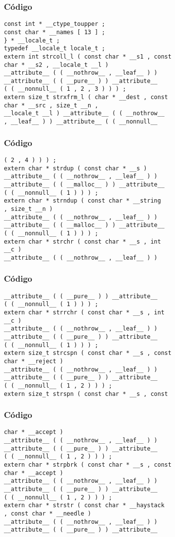 \documentclass{beamer}
\begin{document}
\begin{frame}[fragile]
\frametitle{C\'odigo}
\begin{verbatim}
const int * __ctype_toupper ; 
const char * __names [ 13 ] ; 
} * __locale_t ; 
typedef __locale_t locale_t ; 
extern int strcoll_l ( const char * __s1 , const 
char * __s2 , __locale_t __l ) 
__attribute__ ( ( __nothrow__ , __leaf__ ) ) 
__attribute__ ( ( __pure__ ) ) __attribute__ 
( ( __nonnull__ ( 1 , 2 , 3 ) ) ) ; 
extern size_t strxfrm_l ( char * __dest , const 
char * __src , size_t __n , 
__locale_t __l ) __attribute__ ( ( __nothrow__ 
, __leaf__ ) ) __attribute__ ( ( __nonnull__ 
\end{verbatim}
\end{frame}
\begin{frame}[fragile]
\frametitle{C\'odigo}
\begin{verbatim}
( 2 , 4 ) ) ) ; 
extern char * strdup ( const char * __s ) 
__attribute__ ( ( __nothrow__ , __leaf__ ) ) 
__attribute__ ( ( __malloc__ ) ) __attribute__ 
( ( __nonnull__ ( 1 ) ) ) ; 
extern char * strndup ( const char * __string 
, size_t __n ) 
__attribute__ ( ( __nothrow__ , __leaf__ ) ) 
__attribute__ ( ( __malloc__ ) ) __attribute__ 
( ( __nonnull__ ( 1 ) ) ) ; 
extern char * strchr ( const char * __s , int 
__c ) 
__attribute__ ( ( __nothrow__ , __leaf__ ) ) 
\end{verbatim}
\end{frame}
\begin{frame}[fragile]
\frametitle{C\'odigo}
\begin{verbatim}
__attribute__ ( ( __pure__ ) ) __attribute__ 
( ( __nonnull__ ( 1 ) ) ) ; 
extern char * strrchr ( const char * __s , int 
__c ) 
__attribute__ ( ( __nothrow__ , __leaf__ ) ) 
__attribute__ ( ( __pure__ ) ) __attribute__ 
( ( __nonnull__ ( 1 ) ) ) ; 
extern size_t strcspn ( const char * __s , const 
char * __reject ) 
__attribute__ ( ( __nothrow__ , __leaf__ ) ) 
__attribute__ ( ( __pure__ ) ) __attribute__ 
( ( __nonnull__ ( 1 , 2 ) ) ) ; 
extern size_t strspn ( const char * __s , const 
\end{verbatim}
\end{frame}
\begin{frame}[fragile]
\frametitle{C\'odigo}
\begin{verbatim}
char * __accept ) 
__attribute__ ( ( __nothrow__ , __leaf__ ) ) 
__attribute__ ( ( __pure__ ) ) __attribute__ 
( ( __nonnull__ ( 1 , 2 ) ) ) ; 
extern char * strpbrk ( const char * __s , const 
char * __accept ) 
__attribute__ ( ( __nothrow__ , __leaf__ ) ) 
__attribute__ ( ( __pure__ ) ) __attribute__ 
( ( __nonnull__ ( 1 , 2 ) ) ) ; 
extern char * strstr ( const char * __haystack 
, const char * __needle ) 
__attribute__ ( ( __nothrow__ , __leaf__ ) ) 
__attribute__ ( ( __pure__ ) ) __attribute__ 
\end{verbatim}
\end{frame}
\end{document}
